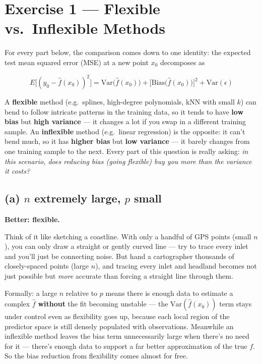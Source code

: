 \documentclass[
  11pt,
]{article}
\author{}
\date{\vspace{-2.5em}}
\begin{document}

\section{Exercise 1 --- Flexible vs.~Inflexible
Methods}\label{exercise-1-flexible-vs.-inflexible-methods}

For every part below, the comparison comes down to one identity: the
expected test mean squared error (MSE) at a new point \(x_0\) decomposes
as

\[
E\Big[(y_0 - \hat{f}(x_0))^2\Big] = \text{Var}\big(\hat{f}(x_0)\big) + \big[\text{Bias}\big(\hat{f}(x_0)\big)\big]^2 + \text{Var}(\epsilon)
\]

A \textbf{flexible} method (e.g.~splines, high-degree polynomials, kNN
with small \(k\)) can bend to follow intricate patterns in the training
data, so it tends to have \textbf{low bias} but \textbf{high variance}
--- it changes a lot if you swap in a different training sample. An
\textbf{inflexible} method (e.g.~linear regression) is the opposite: it
can't bend much, so it has \textbf{higher bias} but \textbf{low
variance} --- it barely changes from one training sample to the next.
Every part of this question is really asking: \emph{in this scenario,
does reducing bias (going flexible) buy you more than the variance it
costs?}

\subsection{\texorpdfstring{(a) \(n\) extremely large, \(p\)
small}{(a) n extremely large, p small}}\label{a-n-extremely-large-p-small}

\textbf{Better: flexible.}

Think of it like sketching a coastline. With only a handful of GPS
points (small \(n\)), you can only draw a straight or gently curved line
--- try to trace every inlet and you'll just be connecting noise. But
hand a cartographer thousands of closely-spaced points (large \(n\)),
and tracing every inlet and headland becomes not just possible but
\emph{more} accurate than forcing a straight line through them.

Formally: a large \(n\) relative to \(p\) means there is enough data to
estimate a complex \(\hat{f}\) \textbf{without} the fit becoming
unstable --- the \(\text{Var}(\hat{f}(x_0))\) term stays under control
even as flexibility goes up, because each local region of the predictor
space is still densely populated with observations. Meanwhile an
inflexible method leaves the bias term unnecessarily large when there's
no need for it --- there's enough data to support a far better
approximation of the true \(f\). So the bias reduction from flexibility
comes almost for free.
\end{document}
